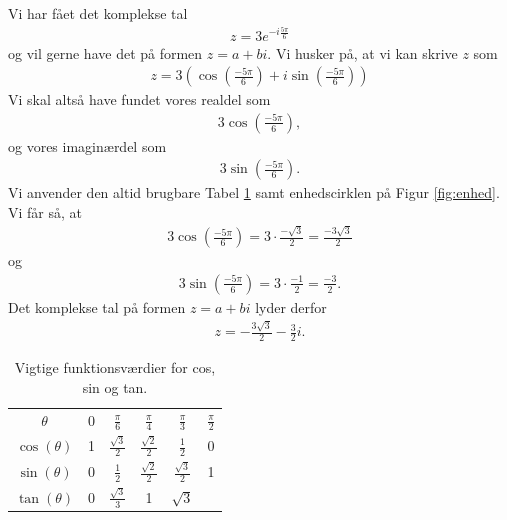 \begin{exa}
	Vi har fået det komplekse tal 
	\begin{align*}
		z = 3e^{-i\frac{5\pi}{6}}
	\end{align*}
	og vil gerne have det på formen $z = a + bi$. Vi husker på, at vi kan skrive $z$ som
	\begin{align*}
		z = 3\left(\cos\left(\frac{-5\pi}{6}\right) + i \sin\left(\frac{-5\pi}{6}\right)\right)
	\end{align*}
	Vi skal altså have fundet vores realdel som 
	\begin{align*}
		3\cos\left(\frac{-5\pi}{6}\right),
	\end{align*}
	og vores imaginærdel som
	\begin{align*}
		3\sin\left(\frac{-5\pi}{6}\right).
	\end{align*}
	Vi anvender den altid brugbare Tabel \ref{tab:trig} samt enhedscirklen på Figur \ref{fig:enhed}.
	Vi får så, at 
	\begin{align*}
		3\cos\left(\frac{-5\pi}{6}\right) = 3\cdot \frac{-\sqrt{3}}{2} = \frac{-3\sqrt{3}}{2}
	\end{align*}
	og 
	\begin{align*}
		3\sin\left(\frac{-5\pi}{6}\right) = 3\cdot \frac{-1}{2} = \frac{-3}{2}.
	\end{align*}
	Det komplekse tal på formen $z = a + bi$ lyder derfor
	\begin{align*}
		z = -\frac{3\sqrt{3}}{2} - \frac{3}{2}i.
	\end{align*}
\end{exa}
\begin{table}[H]
	\centering
	\begin{tabular}{cccccc}
		$\theta$ & 0 & $\frac{\pi}{6}$ & $\frac{\pi}{4}$ & $\frac{\pi}{3}$ & $\frac{\pi}{2}$ \\
		$\cos(\theta)$ & 1 &  $\frac{\sqrt{3}}{2}$ & $\frac{\sqrt{2}}{2}$ & $\frac{1}{2}$ & 0 \\
		$\sin(\theta)$ & 0 & $\frac{1}{2}$ & $\frac{\sqrt{2}}{2}$ &  $\frac{\sqrt{3}}{2}$ & 1 \\
		$\tan(\theta)$ & 0 &  $\frac{\sqrt{3}}{3}$ & 1 & $\sqrt{3}$ & 
	\end{tabular}
	\caption{Vigtige funktionsværdier for cos, sin og tan.}
	\label{tab:trig}
\end{table}
